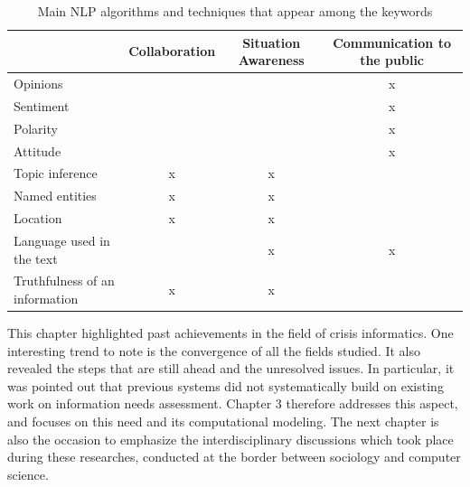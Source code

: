 \begin{table}
    \centering
    \caption{Main NLP algorithms and techniques that appear among the keywords}
    \label{table:lit-review-summary}
    \begin{tabular}{l|ccc}
                                       & Collaboration & Situation Awareness & Communication to the public \\
        \toprule
        Opinions                       &               &                     & x                           \\
        Sentiment                      &               &                     & x                           \\
        Polarity                       &               &                     & x                           \\
        Attitude                       &               &                     & x                           \\
        Topic inference                & x             & x                   &                             \\
        Named entities                 & x             & x                   &                             \\
        Location                       & x             & x                   &                             \\
        Language used in the text      &               & x                   & x                           \\
        Truthfulness of an information & x             & x                   &                             \\
        \bottomrule
    \end{tabular}
\end{table}

This chapter highlighted past achievements in the field of crisis informatics.
One interesting trend to note is the convergence of all the fields studied.
It also revealed the steps that are still ahead and the unresolved issues.
In particular, it was pointed out that previous systems did not systematically build on existing work on information needs assessment.
Chapter 3 therefore addresses this aspect, and focuses on this need and its computational modeling.
The next chapter is also the occasion to emphasize the interdisciplinary discussions which took place during these researches, conducted at the border between sociology and computer science.

